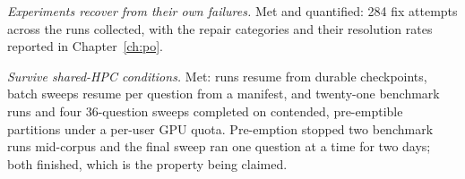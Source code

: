 \begin{description}[style=unboxed,leftmargin=0pt,itemsep=0.3em]
  \item[\textbf{A5}] \emph{Experiments recover from their own failures.} Met and
    quantified: 284 fix attempts across the runs collected, with the repair
    categories and their resolution rates reported in Chapter~\ref{ch:po}.
  \item[\textbf{A6}] \emph{Survive shared-HPC conditions.} Met: runs resume from
    durable checkpoints, batch sweeps resume per question from a manifest, and
    twenty-one benchmark runs and four 36-question sweeps completed on contended,
    pre-emptible partitions under a per-user GPU quota. Pre-emption stopped two
    benchmark runs mid-corpus and the final sweep ran one question at a time for
    two days; both finished, which is the property being claimed.
\end{description}
